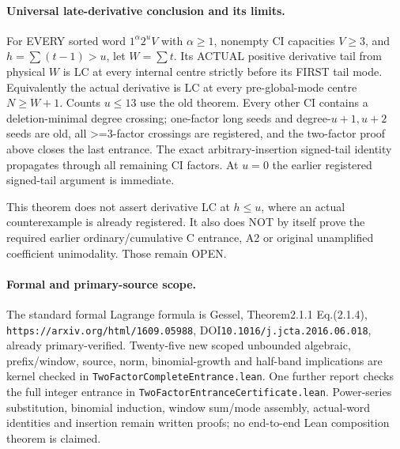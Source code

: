 \paragraph{Universal late-derivative conclusion and its limits.}
For EVERY sorted word $1^\alpha2^uV$ with $\alpha\ge1$,
nonempty CI capacities $V\ge3$, and $h=\sum(t-1)>u$, let
$W=\sum t$. Its ACTUAL positive derivative tail from physical $W$
is LC at every internal centre strictly before its FIRST tail mode.
Equivalently the actual derivative is LC at every pre-global-mode
centre $N\ge W+1$. Counts $u\le13$ use the old theorem. Every
other CI contains a deletion-minimal degree crossing; one-factor
long seeds and degree-$u+1,u+2$ seeds are old, all >=3-factor
crossings are registered, and the two-factor proof above closes
the last entrance. The exact arbitrary-insertion signed-tail identity
propagates through all remaining CI factors. At $u=0$ the earlier
registered signed-tail argument is immediate.

This theorem does not assert derivative LC at $h\le u$, where
an actual counterexample is already registered. It also does NOT
by itself prove the required earlier ordinary/cumulative C entrance,
A2 or original unamplified coefficient unimodality. Those remain OPEN.

\paragraph{Formal and primary-source scope.}
The standard formal Lagrange formula is Gessel, Theorem2.1.1
Eq.(2.1.4), \texttt{https://arxiv.org/html/1609.05988},
DOI\texttt{10.1016/j.jcta.2016.06.018}, already primary-verified.
Twenty-five new scoped unbounded algebraic, prefix/window, source,
norm, binomial-growth and half-band implications are kernel checked
in \texttt{TwoFactorCompleteEntrance.lean}. One further report
checks the full integer entrance in \texttt{TwoFactorEntranceCertificate.lean}.
Power-series substitution, binomial induction, window sum/mode
assembly, actual-word identities and insertion remain written proofs;
no end-to-end Lean composition theorem is claimed.
